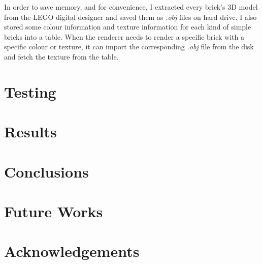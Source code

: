 \documentclass[a4paper]{article}
\begin{document}
            In order to save memory, and for convenience, I extracted every brick's 3D model from the LEGO digital designer and saved them as \textit{.obj} files on hard drive. I also stored some colour information and texture information for each kind of simple bricks into a table. When the renderer needs to render a specific brick with a specific colour or texture, it can import the corresponding \textit{.obj} file from the disk and fetch the texture from the table. 
            
            
        
        
    
    \section{Testing}
    
    \section{Results}
    
    \section{Conclusions}
    
    \section{Future Works}
    
    \section{Acknowledgements}
    
    
    
    \nocite{*}
\end{document}
